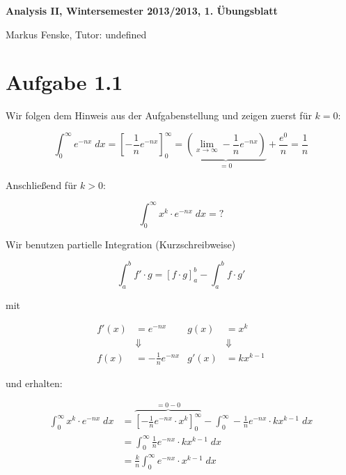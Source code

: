 \documentclass[a4paper,german,12pt,smallheadings]{scrartcl}
\begin{document}
\begin{center}
\bfseries %
\sffamily %
\vspace{-40pt}
Analysis II, Wintersemester 2013/2013, 1. Übungsblatt

Markus Fenske, Tutor: undefined
\vspace{-10pt}
\end{center}

\section*{Aufgabe 1.1}

Wir folgen dem Hinweis aus der Aufgabenstellung und zeigen zuerst für $k=0$:

\begin{equation*}
  \int_0^\infty e^{-nx} \; dx = \left[ -\frac{1}{n} e^{-nx} \right]_0^\infty = \underbrace{\left(\lim_{x \to \infty} - \frac{1}{n} e^{-nx} \right)}_{=0} + \frac{e^0}{n} = \frac{1}{n}
\end{equation*}

Anschließend für $k > 0$:

\begin{equation*}
  \int_0^\infty x^k \cdot e^{-nx} \; dx = \text{?}
\end{equation*}

Wir benutzen partielle Integration (Kurzschreibweise)

\begin{equation*}
  \int_a^b f' \cdot g = \left[f \cdot g\right]_a^b - \int_a^b f \cdot g'
\end{equation*}

mit

\begin{align*}
  f'(x) &= e^{-nx}              & g(x) &= x^k \\
        &\Downarrow             &      &\Downarrow\\
  f(x)  &= -\frac{1}{n} e^{-nx} & g'(x) &= kx^{k-1}
\end{align*}

und erhalten:

\begin{align*}
  \int_0^\infty x^k \cdot e^{-nx} \; dx  &= \overbrace{\left[-\frac{1}{n} e^{-nx} \cdot x^k\right]_0^\infty}^{=0-0} - \int_0^\infty -\frac{1}{n}e^{-nx} \cdot kx^{k-1} \; dx \\
                                         &= \int_0^\infty \frac{1}{n}e^{-nx} \cdot kx^{k-1} \; dx \\
                                         &= \frac{k}{n} \int_0^\infty e^{-nx} \cdot x^{k-1} \; dx
\end{align*}
\end{document}
